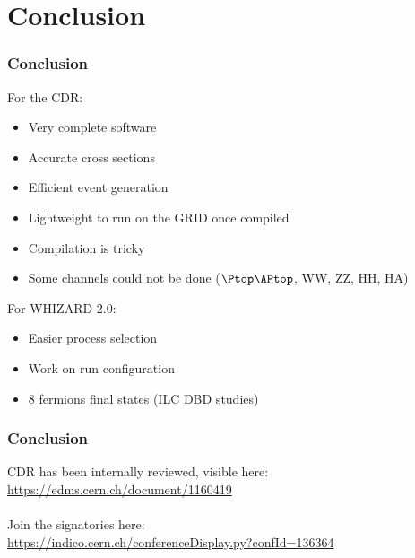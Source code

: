 \documentclass{beamer}
\newcommand{\whizard}{WHIZARD\xspace}
\begin{document}
\section{Conclusion}
\begin{frame}
\frametitle{Conclusion}
For the CDR:
\begin{itemize}
  \item Very complete software
  \item Accurate cross sections
  \item Efficient event generation
  \item Lightweight to run on the GRID once compiled
  \item Compilation is tricky
  \item Some channels could not be done ($\Ptop\APtop$, WW, ZZ, HH, HA)
\end{itemize}
For \whizard 2.0:
\begin{itemize}
  \item Easier process selection
  \item Work on run configuration
  \item 8 fermions final states (ILC DBD studies)
\end{itemize}
\end{frame}
\begin{frame}
\frametitle{Conclusion} 
CDR has been internally reviewed, visible here:\\
 \url{https://edms.cern.ch/document/1160419}\\
~\\
Join the signatories here:\\
\url{https://indico.cern.ch/conferenceDisplay.py?confId=136364}
\end{frame}
\end{document}
